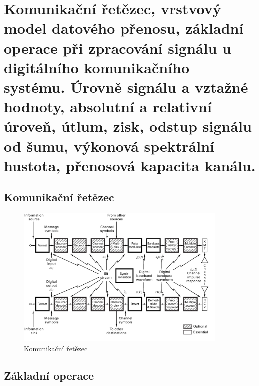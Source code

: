 \section{Komunikační řetězec, vrstvový model datového přenosu, základní operace při zpracování signálu u digitálního komunikačního systému. Úrovně signálu a vztažné hodnoty, absolutní a relativní úroveň, útlum, zisk, odstup signálu od šumu, výkonová spektrální hustota, přenosová kapacita kanálu.
}

\subsection{Komunikační řetězec}

\begin{figure}[h]
    \centering
	\includegraphics[width=0.9\textwidth]{images/010.png}
    \caption{Komunikační řetězec}
    \label{komStr}
\end{figure}

\subsection{Základní operace}

